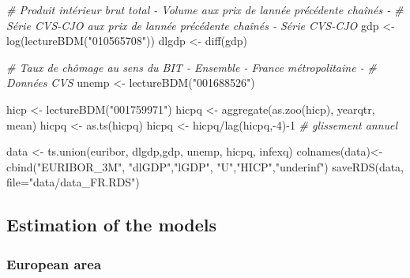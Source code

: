 \documentclass[
  11pt,
]{article}
\newenvironment{Shaded}{\begin{snugshade}}{\end{snugshade}}
\newcommand{\AttributeTok}[1]{\textcolor[rgb]{0.77,0.63,0.00}{#1}}
\newcommand{\CommentTok}[1]{\textcolor[rgb]{0.56,0.35,0.01}{\textit{#1}}}
\newcommand{\DecValTok}[1]{\textcolor[rgb]{0.00,0.00,0.81}{#1}}
\newcommand{\FunctionTok}[1]{\textcolor[rgb]{0.00,0.00,0.00}{#1}}
\newcommand{\NormalTok}[1]{#1}
\newcommand{\OtherTok}[1]{\textcolor[rgb]{0.56,0.35,0.01}{#1}}
\newcommand{\SpecialCharTok}[1]{\textcolor[rgb]{0.00,0.00,0.00}{#1}}
\newcommand{\StringTok}[1]{\textcolor[rgb]{0.31,0.60,0.02}{#1}}
\begin{document}
\begin{Shaded}
\begin{Highlighting}[]
\CommentTok{\# Produit intérieur brut total {-} Volume aux prix de l\textquotesingle{}année précédente chaînés {-} }
\CommentTok{\# Série CVS{-}CJO aux prix de l\textquotesingle{}année précédente chaînés {-} Série CVS{-}CJO}
\NormalTok{gdp }\OtherTok{\textless{}{-}} \FunctionTok{log}\NormalTok{(}\FunctionTok{lectureBDM}\NormalTok{(}\StringTok{"010565708"}\NormalTok{))}
\NormalTok{dlgdp }\OtherTok{\textless{}{-}} \FunctionTok{diff}\NormalTok{(gdp)}

\CommentTok{\# Taux de chômage au sens du BIT {-} Ensemble {-} France métropolitaine {-} }
\CommentTok{\# Données CVS}
\NormalTok{unemp }\OtherTok{\textless{}{-}} \FunctionTok{lectureBDM}\NormalTok{(}\StringTok{"001688526"}\NormalTok{)}

\NormalTok{hicp }\OtherTok{\textless{}{-}} \FunctionTok{lectureBDM}\NormalTok{(}\StringTok{"001759971"}\NormalTok{)}
\NormalTok{hicpq }\OtherTok{\textless{}{-}} \FunctionTok{aggregate}\NormalTok{(}\FunctionTok{as.zoo}\NormalTok{(hicp), yearqtr, mean)}
\NormalTok{hicpq }\OtherTok{\textless{}{-}} \FunctionTok{as.ts}\NormalTok{(hicpq)}
\NormalTok{hicpq }\OtherTok{\textless{}{-}}\NormalTok{ hicpq}\SpecialCharTok{/}\FunctionTok{lag}\NormalTok{(hicpq,}\SpecialCharTok{{-}}\DecValTok{4}\NormalTok{)}\SpecialCharTok{{-}}\DecValTok{1} \CommentTok{\# glissement annuel}

\NormalTok{data }\OtherTok{\textless{}{-}} \FunctionTok{ts.union}\NormalTok{(euribor, dlgdp,gdp, unemp, hicpq, infexq)}
\FunctionTok{colnames}\NormalTok{(data)}\OtherTok{\textless{}{-}}\FunctionTok{cbind}\NormalTok{(}\StringTok{"EURIBOR\_3M"}\NormalTok{, }\StringTok{"dlGDP"}\NormalTok{,}\StringTok{"lGDP"}\NormalTok{,}
                      \StringTok{"U"}\NormalTok{,}\StringTok{"HICP"}\NormalTok{,}\StringTok{"underinf"}\NormalTok{)}
\FunctionTok{saveRDS}\NormalTok{(data, }\AttributeTok{file=}\StringTok{"data/data\_FR.RDS"}\NormalTok{)}
\end{Highlighting}
\end{Shaded}

\hypertarget{estimation-of-the-models}{%
\subsection{Estimation of the models}\label{estimation-of-the-models}}

\hypertarget{european-area}{%
\subsubsection{European area}\label{european-area}}
\end{document}
